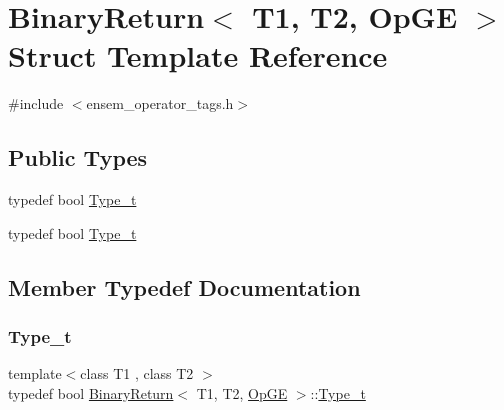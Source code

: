 \hypertarget{structBinaryReturn_3_01T1_00_01T2_00_01OpGE_01_4}{}\section{Binary\+Return$<$ T1, T2, Op\+GE $>$ Struct Template Reference}
\label{structBinaryReturn_3_01T1_00_01T2_00_01OpGE_01_4}


{\ttfamily \#include $<$ensem\+\_\+operator\+\_\+tags.\+h$>$}

\subsection*{Public Types}
\begin{DoxyCompactItemize}
\item 
typedef bool \mbox{\hyperlink{structBinaryReturn_3_01T1_00_01T2_00_01OpGE_01_4_a6bd095ff97c42640d8b1f733b75cf784}{Type\+\_\+t}}
\item 
typedef bool \mbox{\hyperlink{structBinaryReturn_3_01T1_00_01T2_00_01OpGE_01_4_a6bd095ff97c42640d8b1f733b75cf784}{Type\+\_\+t}}
\end{DoxyCompactItemize}


\subsection{Member Typedef Documentation}
\mbox{\label{structBinaryReturn_3_01T1_00_01T2_00_01OpGE_01_4_a6bd095ff97c42640d8b1f733b75cf784}} 
\subsubsection{\texorpdfstring{Type\_t}{Type\_t}\hspace{0.1cm}{\footnotesize\ttfamily [1/2]}}
{\footnotesize\ttfamily template$<$class T1 , class T2 $>$ \\
typedef bool \mbox{\hyperlink{structBinaryReturn}{Binary\+Return}}$<$ T1, T2, \mbox{\hyperlink{structOpGE}{Op\+GE}} $>$\+::\mbox{\hyperlink{structBinaryReturn_3_01T1_00_01T2_00_01OpGE_01_4_a6bd095ff97c42640d8b1f733b75cf784}{Type\+\_\+t}}}

\mbox{\label{structBinaryReturn_3_01T1_00_01T2_00_01OpGE_01_4_a6bd095ff97c42640d8b1f733b75cf784}} 
